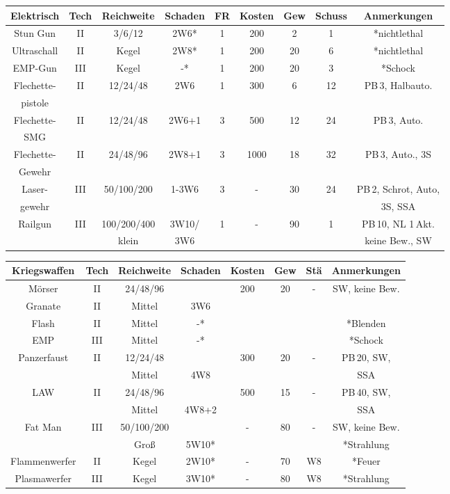 \documentclass[10pt,a4paper]{report}
\begin{document}
\begin{table}
\begin{tabular}{|c|c|c|c|c|c|c|c|c|}
\hline 
\textbf{Elektrisch} & Tech & Reichweite & Schaden & FR & Kosten & Gew & Schuss & Anmerkungen \\ 
\hline 
Stun Gun & II & 3/6/12 & 2W6* & 1 & 200 & 2 & 1 & *nichtlethal \\ 
\hline 
Ultraschall & II & Kegel & 2W8* & 1 & 200 & 20 & 6 & *nichtlethal \\ 
\hline 
EMP-Gun & III & Kegel & -* & 1 & 200 & 20 & 3 & *Schock \\ 
\hline 
Flechette- & II & 12/24/48 & 2W6 & 1 & 300 & 6 & 12 & PB\,3, Halbauto. \\ 
pistole & & & & & & & & \\
\hline 
Flechette- & II & 12/24/48 & 2W6+1 & 3 & 500 & 12 & 24 & PB\,3, Auto. \\ 
SMG & & & & & & & & \\
\hline 
Flechette- & II & 24/48/96 & 2W8+1 & 3 & 1000 & 18 & 32 & PB\,3, Auto., 3S \\ 
Gewehr & & & & & & & & \\
\hline
Laser-& III & 50/100/200 & 1-3W6 & 3 & - & 30 & 24 & PB\,2, Schrot, Auto, \\ 
gewehr & & & & & & & & 3S, SSA\\
\hline 
Railgun 	& III &100/200/400& 3W10/ & 1 & - & 90 & 1 & PB\,10, NL 1\,Akt.\\ 
& & klein & 3W6 & & & & &keine Bew., SW\\
\hline 
\end{tabular}
\end{table}

\begin{table}
\begin{tabular}{|c|c|c|c|c|c|c|c|}
\hline 
\textbf{Kriegswaffen} & Tech & Reichweite & Schaden &  Kosten & Gew & Stä & Anmerkungen \\ 
\hline 
Mörser & II & 24/48/96 & & 200 & 20 & - & SW, keine Bew. \\ 
Granate & II & Mittel & 3W6 & & & & \\
Flash & II & Mittel & -* & & & & *Blenden \\
EMP & III & Mittel & -* & & & & *Schock \\
\hline 
Panzerfaust & II & 12/24/48 & & 300 & 20 & - & PB\,20, SW, \\ 
 & & Mittel & 4W8 & & & &  SSA\\
\hline 
LAW & II & 24/48/96 & & 500 & 15 & - & PB\,40, SW, \\ 
 & & Mittel & 4W8+2 & & & &  SSA\\
\hline 
Fat Man & III & 50/100/200 & & - & 80 & - & SW, keine Bew. \\ 
 & & Groß & 5W10* & & & & *Strahlung \\
\hline 
Flammenwerfer & II & Kegel & 2W10* & - & 70 & W8 & *Feuer \\ 
\hline 
Plasmawerfer & III & Kegel & 3W10* & - & 80 & W8 & *Strahlung \\ 
\hline
\end{tabular}
\end{table}
\end{document}
